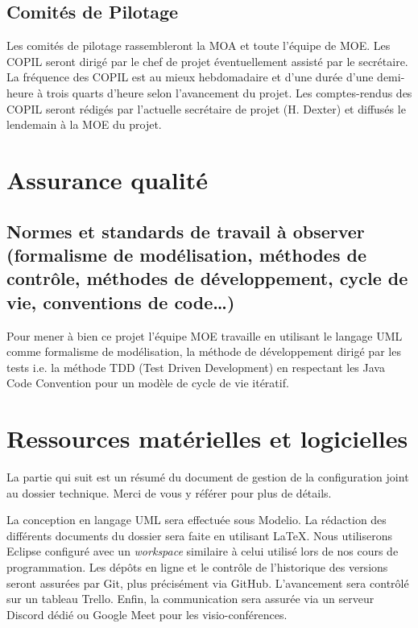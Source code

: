 \documentclass[12pt,a4paper,titlepage,openany, oneside]{report}
\begin{document}
    \subsection{Comités de Pilotage}
    Les comités de pilotage rassembleront la MOA et toute l’équipe de MOE. Les
    COPIL seront dirigé par le chef de projet éventuellement assisté par le
    secrétaire.
    \\La fréquence des COPIL est au mieux hebdomadaire et d’une durée d’une
    demi-heure à trois quarts d’heure selon l’avancement du projet.
    Les comptes-rendus des COPIL seront rédigés par l’actuelle secrétaire de
    projet (H. Dexter) et diffusés le lendemain à la MOE du projet.


    \section{Assurance qualité}
    \subsection{Normes et standards de travail à observer (formalisme de modélisation, méthodes de contrôle, méthodes de développement, cycle de vie, conventions de code…)}
    Pour mener à bien ce projet l'équipe MOE travaille
    en utilisant le langage UML comme formalisme de modélisation, la méthode de
    développement dirigé par les tests i.e. la méthode TDD (Test Driven
    Development) en respectant les Java Code Convention pour un modèle de cycle
    de vie itératif.



    \section{Ressources matérielles et logicielles}
        La partie qui suit est un résumé du document de gestion de la configuration joint
        au dossier technique. Merci de vous y référer pour plus de détails.

        La conception en langage UML sera effectuée sous Modelio. La rédaction des
        différents documents du dossier sera faite en utilisant \LaTeX. Nous utiliserons
        Eclipse configuré avec un \emph{workspace} similaire à celui utilisé lors de nos
        cours de programmation. Les dépôts en ligne et le contrôle de l'historique des
        versions seront assurées par Git, plus précisément via GitHub. L'avancement sera
        contrôlé sur un tableau Trello. Enfin, la communication sera assurée via un
        serveur Discord dédié ou Google Meet pour les visio-conférences.
\end{document}
